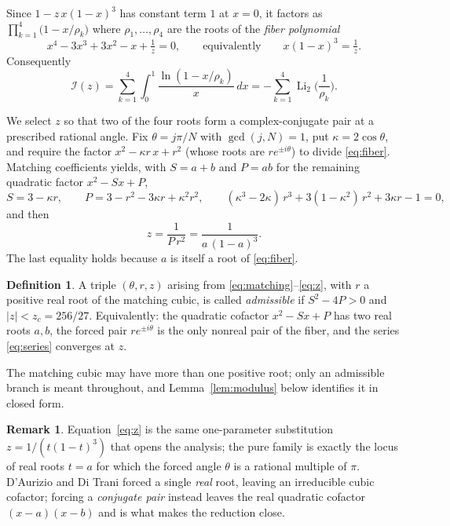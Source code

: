 \documentclass[11pt]{article}
\theoremstyle{definition}
\newtheorem{definition}[theorem]{Definition}
\newtheorem{remark}[theorem]{Remark}
\DeclareMathOperator{\Li}{Li}
\begin{document}
Since $1-z\,x(1-x)^3$ has constant term $1$ at $x=0$, it factors as
$\prod_{k=1}^4\big(1-x/\rho_k\big)$ where $\rho_1,\dots,\rho_4$ are the roots of the
\emph{fiber polynomial}
\begin{equation}\label{eq:fiber}
  x^4-3x^3+3x^2-x+\tfrac1z=0,\qquad\text{equivalently}\qquad x(1-x)^3=\tfrac1z .
\end{equation}
Consequently
\begin{equation}\label{eq:dilog}
  \mathcal{I}(z)=\sum_{k=1}^4\int_0^1\frac{\ln(1-x/\rho_k)}{x}\,dx
  = -\sum_{k=1}^4\Li_2\!\Big(\frac1{\rho_k}\Big).
\end{equation}

We select $z$ so that two of the four roots form a complex-conjugate pair at a prescribed rational
angle. Fix $\theta=j\pi/N$ with $\gcd(j,N)=1$, put $\kappa=2\cos\theta$, and require the factor
$x^2-\kappa r\,x+r^2$ (whose roots are $r e^{\pm i\theta}$) to divide \eqref{eq:fiber}. Matching
coefficients yields, with $S=a+b$ and $P=ab$ for the remaining quadratic factor $x^2-Sx+P$,
\begin{equation}\label{eq:matching}
  S=3-\kappa r,\qquad P=3-r^2-3\kappa r+\kappa^2r^2,\qquad
  (\kappa^3-2\kappa)\,r^3+3(1-\kappa^2)\,r^2+3\kappa r-1=0,
\end{equation}
and then
\begin{equation}\label{eq:z}
  z=\frac1{P\,r^2}=\frac1{a\,(1-a)^3}.
\end{equation}
The last equality holds because $a$ is itself a root of \eqref{eq:fiber}.

\begin{definition}\label{def:admissible}
A triple $(\theta,r,z)$ arising from \eqref{eq:matching}--\eqref{eq:z}, with $r$ a positive real root
of the matching cubic, is called \emph{admissible} if $S^2-4P>0$ and $|z|<z_c=256/27$. Equivalently:
the quadratic cofactor $x^2-Sx+P$ has two real roots $a,b$, the forced pair $re^{\pm i\theta}$ is the
only nonreal pair of the fiber, and the series \eqref{eq:series} converges at $z$.
\end{definition}

The matching cubic may have more than one positive root; only an admissible branch is meant
throughout, and Lemma~\ref{lem:modulus} below identifies it in closed form.

\begin{remark}
Equation~\eqref{eq:z} is the same one-parameter substitution $z=1/(t(1-t)^3)$ that opens the
analysis; the pure family is exactly the locus of real roots $t=a$ for which the forced angle
$\theta$ is a rational multiple of $\pi$. D'Aurizio and Di Trani forced a single \emph{real} root,
leaving an irreducible cubic cofactor; forcing a \emph{conjugate pair} instead leaves the real
quadratic cofactor $(x-a)(x-b)$ and is what makes the reduction close.
\end{remark}
\end{document}
